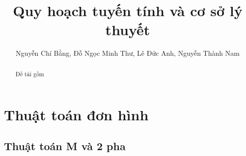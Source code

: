 \documentclass{article}
\title{Quy hoạch tuyến tính và cơ sở lý thuyết}
\author{Nguyễn Chí Bằng, Đỗ Ngọc Minh  Thư, Lê Đức Anh, Nguyễn Thành Nam}
\begin{document}
\maketitle

\begin{abstract}
    Đề tài gồm 

\end{abstract}

\tableofcontents

\section{Thuật toán đơn hình}
    \subsection{Thuật toán M và 2 pha}
\end{document}
